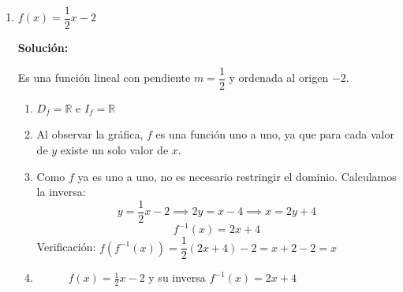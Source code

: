 \documentclass[12pt]{article}
\begin{document}
\begin{enumerate}[label=\alph*.-]

\item $f(x) = \dfrac{1}{2}x - 2$

\textbf{Solución:}

Es una función lineal con pendiente $m = \dfrac{1}{2}$ y ordenada al origen $-2$.

\begin{enumerate}[label=\roman*.]
    \item $D_f = \mathbb{R}$ \quad e \quad $I_f = \mathbb{R}$

    \item Al observar la gráfica, $f$ es una función uno a uno, ya que para cada valor de $y$ existe un solo valor de $x$.

    \item Como $f$ ya es uno a uno, no es necesario restringir el dominio. Calculamos la inversa:
    \[
    y = \frac{1}{2}x - 2 \implies 2y = x - 4 \implies x = 2y + 4
    \]
    \[
    \boxed{f^{-1}(x) = 2x + 4}
    \]
    Verificación: $f(f^{-1}(x)) = \dfrac{1}{2}(2x+4) - 2 = x + 2 - 2 = x$ \checkmark

    \item
    \begin{figure}[H]
        \centering
        \caption{$f(x) = \frac{1}{2}x - 2$ y su inversa $f^{-1}(x) = 2x + 4$}
    \end{figure}
\end{enumerate}


\end{enumerate}
\end{document}
